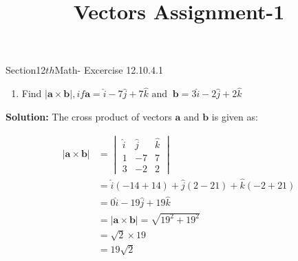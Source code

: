 \documentclass[12pt]{article}
\newcommand{\mydet}[1]{\ensuremath{\begin{vmatrix}#1\end{vmatrix}}}
\providecommand{\abs}[1]{\left\vert#1\right\vert}
\newcommand{\solution}{\noindent \textbf{Solution: }}
\let\vec\mathbf
\begin{document}
\begin{center}\title{\textbf{Vectors Assignment-1}}
\date{\vspace{-5ex}}
\maketitle
\end{center}
Section{12${th}$Math- Excercise 12.10.4.1}

\begin{enumerate}
\item Find $\abs{\vec{a}\times\vec{b}},if \vec{a}=\hat{i}-7\hat{j}+7\hat{k}\text{ and }\ \vec{b}=3\hat{i}-2\hat{j}+2\hat{k}$
\end{enumerate}
\solution
The cross product of vectors $\vec{a}\text{ and } \vec{b}$ is given as:

\begin{align}
	\abs{\vec{a}\times\vec{b}}&= \mydet{ \hat{i} & \hat{j} & \hat{k}\\ 1 & -7 & 7\\ 3 & -2 & 2}\\
	&=\hat{i}(-14+14) + \hat{j}(2-21) + \hat{k}(-2+21)\\
	&=0\hat{i}-19\hat{j}+19\hat{k}\\
	&=\abs{\vec{a}\times\vec{b}}=\sqrt{19^2+19^2}\\
	&=\sqrt{2}\times19\\
	&=19\sqrt{2}
\end{align}
\end{document}
